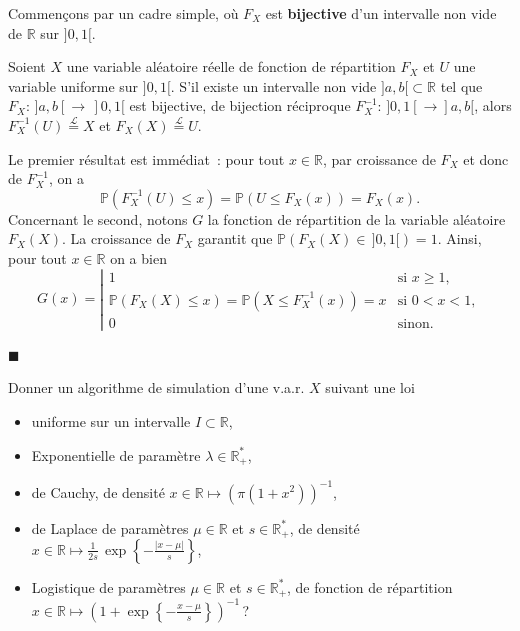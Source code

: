 Commençons par un cadre simple, où \(F_X\) est \textbf{bijective} d'un
intervalle non vide de \(\mathbb{R}\) sur \(]0,1[\).

\begin{proposition}\label{V-invbij}

Soient \(X\) une variable aléatoire réelle de fonction de répartition
\(F_X\) et \(U\) une variable uniforme sur \(]0,1[\). S'il existe un
intervalle non vide \(]a,b[ \subset \mathbb{R}\) tel que
\(F_X :\, ]a,b[ \to \,]0,1[\) est bijective, de bijection réciproque
\(F_X^{-1} :\, ]0,1[ \to ]a,b[\), alors
\(F_X^{-1}(U) \overset{\mathcal{L}}{=} X\) et
\(F_X(X) \overset{\mathcal{L}}{=} U\).
\end{proposition}

\begin{preuve}
Le premier résultat est immédiat~: pour tout \(x\in\mathbb{R}\), par
croissance de \(F_X\) et donc de \(F_X^{-1}\), on a
\[\mathbb{P}\left(F_X^{-1}(U)\leq x\right) = \mathbb{P}\left(U \leq F_X(x) \right) = F_X(x).\]
Concernant le second, notons \(G\) la fonction de répartition de la
variable aléatoire \(F_X(X)\). La croissance de \(F_X\) garantit que
\(\mathbb{P}\left(F_X(X) \in\, ]0,1[\right) = 1\). Ainsi, pour tout
\(x\in\mathbb{R}\) on a bien
\[G(x) = \left|\begin{array}{ll} 1 & \text{si } x \geq 1,\\ \mathbb{P}\left(F_X(X)\leq x\right) = \mathbb{P}\left( X \leq F_X^{-1}(x) \right) = x & \text{si } 0 < x < 1,\\ 0 & \text{sinon.}\end{array}\right.\]

\hfill$\blacksquare$
\end{preuve}

\label{V-exemples1}
Donner un algorithme de simulation d'une v.a.r. \(X\) suivant une loi

\begin{itemize}
\tightlist
\item
  uniforme sur un intervalle \(I \subset \mathbb{R}\),
\item
  Exponentielle de paramètre \(\lambda \in \mathbb{R}_+^\ast\),
\item
  de Cauchy, de densité
  \(x\in\mathbb{R}\mapsto \left(\pi\left(1+x^2\right)\right)^{-1}\),
\item
  de Laplace de paramètres \(\mu \in \mathbb{R}\) et
  \(s\in\mathbb{R}_+^\ast\), de densité
  \(x\in\mathbb{R}\mapsto \frac{1}{2s}\,\exp\left\{-\frac{|x-\mu|}{s}\right\}\),
\item
  Logistique de paramètres \(\mu \in \mathbb{R}\) et
  \(s\in\mathbb{R}_+^\ast\), de fonction de répartition
  \(x\in\mathbb{R}\mapsto \left(1 + \exp\left\{-\frac{x-\mu}{s} \right\}\right)^{-1}\)\,?
\end{itemize}


